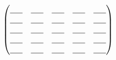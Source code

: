 \documentclass[margin=1mm]{standalone}
\newcommand{\gap}{\uline{\hspace{1.5em}}}
\begin{document}
	$\begin{pmatrix}
			\gap & \gap & \gap & \gap & \gap \\
			\gap & \gap & \gap & \gap & \gap \\
			\gap & \gap & \gap & \gap & \gap \\
			\gap & \gap & \gap & \gap & \gap \\
			\gap & \gap & \gap & \gap & \gap 
		\end{pmatrix}
	$
\end{document}
